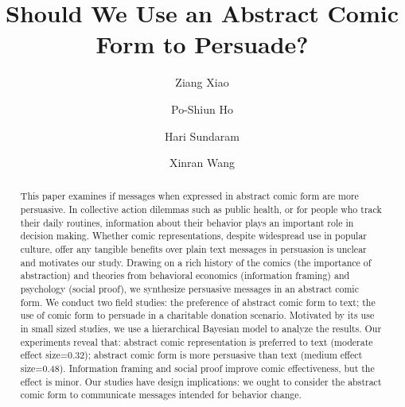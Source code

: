 \documentclass[format=sigchi, natbib=false, review=false, authordraft=false, anonymous=true, screen=true]{acmart}
\begin{document}
\title[The Abstract Comic Form for Persuasion]{Should We Use an Abstract Comic Form to Persuade?}


\author{Ziang Xiao}
\author{Po-Shiun Ho}
\author{Hari Sundaram}
\author{Xinran Wang}




\begin{abstract}
 This paper examines if messages when expressed in abstract comic form are more persuasive. In collective action dilemmas such as public health, or for people who track their daily routines, information about their behavior plays an important role in decision making. Whether comic representations, despite widespread use in popular culture, offer any tangible benefits over plain text messages in persuasion is unclear and motivates our study. Drawing on a rich history of the comics (the importance of abstraction) and theories from behavioral economics (information framing) and psychology (social proof), we synthesize persuasive messages in an abstract comic form. We conduct two field studies: the preference of abstract comic form to text; the use of comic form to persuade in a charitable donation scenario. Motivated by its use in small sized studies, we use a hierarchical Bayesian model to analyze the results. Our experiments reveal that: abstract comic representation is preferred to text (moderate effect size=0.32); abstract comic form is more persuasive than text (medium effect size=0.48). Information framing and social proof improve comic effectiveness, but the effect is minor. Our studies have design implications: we ought to consider the abstract comic form to communicate messages intended for behavior change.
\end{abstract}
\end{document}
